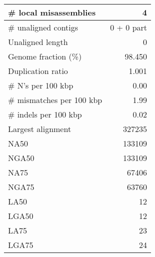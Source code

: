 \documentclass[12pt,a4paper]{article}
\begin{document}
\begin{table}[ht]
\begin{center}
\begin{tabular}{|l*{1}{|r}|}
\# local misassemblies & 4 \\ \hline
\# unaligned contigs & 0 + 0 part \\ \hline
Unaligned length & 0 \\ \hline
Genome fraction (\%) & 98.450 \\ \hline
Duplication ratio & 1.001 \\ \hline
\# N's per 100 kbp & 0.00 \\ \hline
\# mismatches per 100 kbp & 1.99 \\ \hline
\# indels per 100 kbp & 0.02 \\ \hline
Largest alignment & 327235 \\ \hline
NA50 & 133109 \\ \hline
NGA50 & 133109 \\ \hline
NA75 & 67406 \\ \hline
NGA75 & 63760 \\ \hline
LA50 & 12 \\ \hline
LGA50 & 12 \\ \hline
LA75 & 23 \\ \hline
LGA75 & 24 \\ \hline
\end{tabular}
\end{center}
\end{table}
\end{document}
